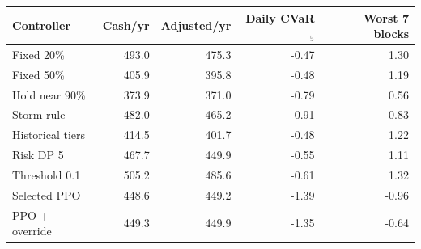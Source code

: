 \begin{tabular}{lrrrr}
\toprule
Controller & Cash/yr & Adjusted/yr & Daily CVaR$_5$ & Worst 7 blocks \\
\midrule
Fixed 20\% & 493.0 & 475.3 & -0.47 & 1.30 \\
Fixed 50\% & 405.9 & 395.8 & -0.48 & 1.19 \\
Hold near 90\% & 373.9 & 371.0 & -0.79 & 0.56 \\
Storm rule & 482.0 & 465.2 & -0.91 & 0.83 \\
Historical tiers & 414.5 & 401.7 & -0.48 & 1.22 \\
Risk DP 5 & 467.7 & 449.9 & -0.55 & 1.11 \\
Threshold 0.1 & 505.2 & 485.6 & -0.61 & 1.32 \\
Selected PPO & 448.6 & 449.2 & -1.39 & -0.96 \\
PPO + override & 449.3 & 449.9 & -1.35 & -0.64 \\
\bottomrule
\end{tabular}
